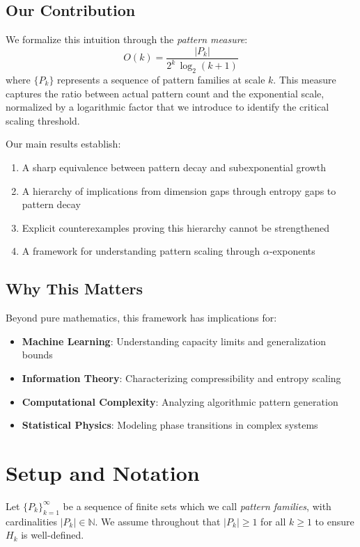 \documentclass[11pt]{article}
\theoremstyle{definition}
\newcommand{\bbN}{\mathbb{N}}
\begin{document}
\subsection{Our Contribution}

We formalize this intuition through the \emph{pattern measure}:
$$O(k) = \frac{|P_k|}{2^k\,\log_2(k+1)}$$
where $\{P_k\}$ represents a sequence of pattern families at scale $k$. This measure captures the ratio between actual pattern count and the exponential scale, normalized by a logarithmic factor that we introduce to identify the critical scaling threshold.

Our main results establish:
\begin{enumerate}
\item A sharp equivalence between pattern decay and subexponential growth
\item A hierarchy of implications from dimension gaps through entropy gaps to pattern decay
\item Explicit counterexamples proving this hierarchy cannot be strengthened
\item A framework for understanding pattern scaling through $\alpha$-exponents
\end{enumerate}

\subsection{Why This Matters}

Beyond pure mathematics, this framework has implications for:
\begin{itemize}
\item \textbf{Machine Learning}: Understanding capacity limits and generalization bounds
\item \textbf{Information Theory}: Characterizing compressibility and entropy scaling
\item \textbf{Computational Complexity}: Analyzing algorithmic pattern generation
\item \textbf{Statistical Physics}: Modeling phase transitions in complex systems
\end{itemize}

\section{Setup and Notation}

Let $\{P_k\}_{k=1}^\infty$ be a sequence of finite sets which we call \emph{pattern families}, with cardinalities $|P_k|\in\bbN$. We assume throughout that $|P_k| \geq 1$ for all $k \geq 1$ to ensure $H_k$ is well-defined.
\end{document}
